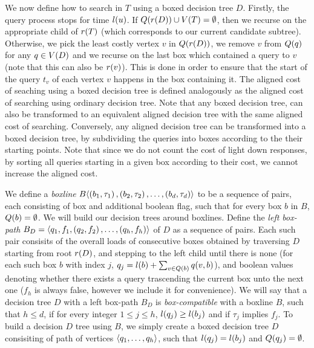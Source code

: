 We now define how to search in $T$ using a boxed decision tree $D$. Firstly, the query process stops for time $l\mathopen{}\left( u \right)$. If $Q\mathopen{}\left( r\mathopen{}\left( D \right) \right)\cup V\mathopen{}\left( T \right) = \emptyset$, then we recurse on the appropriate child of $r\mathopen{}\left( T \right)$ (which corresponds to our current candidate subtree). Otherwise, we pick the least costly vertex $v$ in $Q\mathopen{}\left( r\mathopen{}\left( D \right) \right)$, we remove $v$ from $Q\mathopen{}\left( q \right)$ for any $q\in V\mathopen{}\left( D \right)$ and we recurse on the last box which contained a query to $v$ (note that this can also be $r\mathopen{}\left( v \right)$). This is done in order to ensure that the start of the query $t_v$ of each vertex $v$ happens in the box containing it. The aligned cost of seaching using a boxed decision tree is defined analogously as the aligned cost of searching using ordinary decision tree. Note that any boxed decision tree, can also be transformed to an equivalent aligned decision tree with the same aligned cost of searching. Conversely, any aligned decision tree can be transformed into a boxed decision tree, by subdividing the queries into boxes according to the their starting points. Note that since we do not count the cost of light down responses, by sorting all queries starting in a given box according to their cost, we cannot increase the aligned cost.



We define a \textit{boxline} $B\mathopen{}\langle \mathopen{}\left( b_1, \tau_1 \right),\mathopen{}\left( b_2, \tau_2 \right),\dots, \mathopen{}\left( b_d, \tau_d \right) \rangle$ to be a sequence of pairs, each consisting of box and additional boolean flag, such that for every box $b$ in $B$, $Q\mathopen{}\left( b \right)=\emptyset$. We will build our decision trees around boxlines. Define the \textit{left box-path} $B_D=\mathopen{}\langle {q_1, f_1},\mathopen{}\left( q_2, f_2 \right),\dots, \mathopen{}\left( q_h, f_h \right) \rangle$ of $D$ as a sequence of pairs. Each such pair consisits of the overall loads of consecutive boxes obtained by traversing $D$ starting from root $r\mathopen{}\left( D \right)$, and stepping to the left child until there is none (for each such box $b$ with index $j$, $q_j=l\mathopen{}\left( b \right)+\sum_{v\in Q\mathopen{}\left( b \right)}q\mathopen{}\left( v, b \right)$), and boolean values denoting whether there exists a query trascending the current box unto the next one ($f_h$ is always false, however we include it for convenience). We will say that a decision tree $D$ with a left box-path $B_D$ is \textit{box-compatible} with a boxline $B$, such that $h\leq d$, if for every integer $1\leq j \leq h$, $l\mathopen{}\left( q_j \right)\geq l\mathopen{}\left( b_j \right)$ and if $\tau_j$ implies $f_j$. To build a decision $D$ tree using $B$, we simply create a boxed decision tree $D$ consisiting of path of vertices $\mathopen{}\langle q_1,\dots, q_h \rangle$, such that $l\mathopen{}\left( q_j \right)=l\mathopen{}\left( b_j \right)$ and $Q\mathopen{}\left( q_j \right)=\emptyset$.

